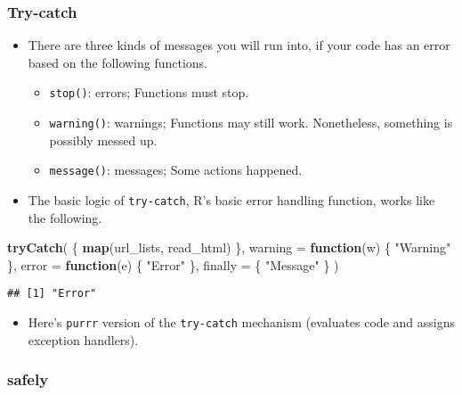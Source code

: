 \documentclass[
]{book}
\newenvironment{Shaded}{\begin{snugshade}}{\end{snugshade}}
\newcommand{\ControlFlowTok}[1]{\textcolor[rgb]{0.13,0.29,0.53}{\textbf{#1}}}
\newcommand{\DataTypeTok}[1]{\textcolor[rgb]{0.13,0.29,0.53}{#1}}
\newcommand{\KeywordTok}[1]{\textcolor[rgb]{0.13,0.29,0.53}{\textbf{#1}}}
\newcommand{\NormalTok}[1]{#1}
\newcommand{\StringTok}[1]{\textcolor[rgb]{0.31,0.60,0.02}{#1}}
\providecommand{\tightlist}{%
  \setlength{\itemsep}{0pt}\setlength{\parskip}{0pt}}
\begin{document}
\hypertarget{try-catch}{%
\subsubsection{Try-catch}\label{try-catch}}

\begin{itemize}
\item
  There are three kinds of messages you will run into, if your code has an error based on the following functions.

  \begin{itemize}
  \tightlist
  \item
    \texttt{stop()}: errors; Functions must stop.
  \item
    \texttt{warning()}: warnings; Functions may still work. Nonetheless, something is possibly messed up.
  \item
    \texttt{message()}: messages; Some actions happened.
  \end{itemize}
\item
  The basic logic of \texttt{try-catch}, R's basic error handling function, works like the following.
\end{itemize}

\begin{Shaded}
\begin{Highlighting}[]
\KeywordTok{tryCatch}\NormalTok{(}
\NormalTok{  \{}
    \KeywordTok{map}\NormalTok{(url\_lists, read\_html)}
\NormalTok{  \},}
  \DataTypeTok{warning =} \ControlFlowTok{function}\NormalTok{(w) \{}
    \StringTok{"Warning"}
\NormalTok{  \},}
  \DataTypeTok{error =} \ControlFlowTok{function}\NormalTok{(e) \{}
    \StringTok{"Error"}
\NormalTok{  \},}
  \DataTypeTok{finally =}\NormalTok{ \{}
    \StringTok{"Message"}
\NormalTok{  \}}
\NormalTok{)}
\end{Highlighting}
\end{Shaded}

\begin{verbatim}
## [1] "Error"
\end{verbatim}

\begin{itemize}
\tightlist
\item
  Here's \texttt{purrr} version of the \texttt{try-catch} mechanism (evaluates code and assigns exception handlers).
\end{itemize}

\hypertarget{safely}{%
\subsubsection{safely}\label{safely}}
\end{document}
